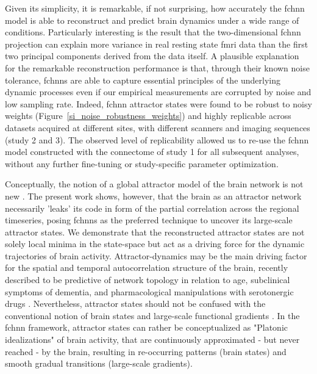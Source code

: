 \documentclass{article}
\begin{document}
Given its simplicity, it is remarkable, if not surprising, how accurately the \acrshort{fchnn} model is able to reconstruct and predict brain dynamics under a wide range of conditions. Particularly interesting is the result that the two-dimensional \acrshort{fchnn} projection can explain more variance in real resting state \acrshort{fmri} data than the first two principal components derived from the data itself.
A plausible explanation for the remarkable reconstruction performance is that, through their known noise tolerance, \acrshort{fchnn}s are able to capture essential principles of the underlying dynamic processes even if our empirical measurements are corrupted by noise and low sampling rate.
Indeed, \acrshort{fchnn} attractor states were found to be robust to noisy weights (Figure~\ref{si_noise_robustness_weights}) and highly replicable across datasets acquired at different sites, with different scanners and imaging sequences (study 2 and 3). The observed level of replicability allowed us to re-use the \acrshort{fchnn} model constructed with the connectome of study 1 for all subsequent analyses, without any further fine-tuning or study-specific parameter optimization.

Conceptually, the notion of a global attractor model of the brain network is not new \citep{deco2012ongoing}. The present work shows, however, that the brain as an attractor network necessarily 'leaks' its code in form of the partial correlation across the regional timeseries, posing \acrshort{fchnn}s as the preferred technique to uncover its large-scale attractor states. We demonstrate that the reconstructed attractor states are not solely local minima in the state-space but act as a driving force for the dynamic trajectories of brain activity. Attractor-dynamics may be the main driving factor for the spatial and temporal autocorrelation structure of the brain, recently described to be predictive of network topology in relation to age, subclinical symptoms of dementia, and pharmacological manipulations with serotonergic drugs \citep{shinn2023functional}.
Nevertheless, attractor states should not be confused with the conventional notion of brain states \citep{chen2015introducing} and large-scale functional gradients \citep{margulies2016situating}. In the \acrshort{fchnn} framework, attractor states can rather be conceptualized as "Platonic idealizations" of brain activity, that are continuously approximated - but never reached - by the brain, resulting in re-occurring patterns (brain states) and smooth gradual transitions (large-scale gradients).
\end{document}
